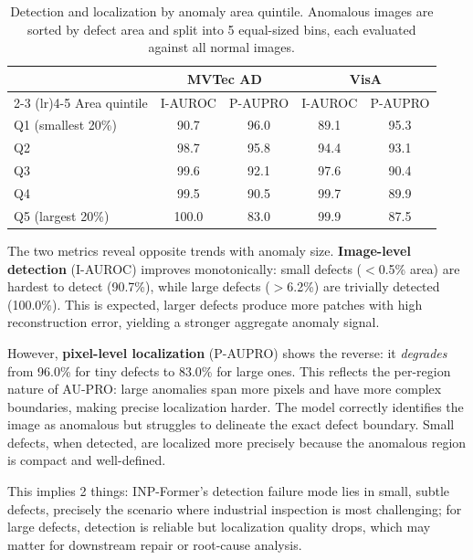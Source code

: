 \documentclass[10pt]{article} %
\begin{document}
\begin{table}[t]
\caption{Detection and localization by anomaly area quintile. Anomalous images are sorted by defect area and split into 5 equal-sized bins, each evaluated against all normal images.}
\label{tab:area}
\begin{center}
\begin{tabular}{lcccc}
\toprule
 & \multicolumn{2}{c}{MVTec AD} & \multicolumn{2}{c}{VisA} \\
\cmidrule(lr){2-3} \cmidrule(lr){4-5}
Area quintile & I-AUROC & P-AUPRO & I-AUROC & P-AUPRO \\
\midrule
Q1 (smallest 20\%) & 90.7 & 96.0 & 89.1 & 95.3 \\
Q2                  & 98.7 & 95.8 & 94.4 & 93.1 \\
Q3                  & 99.6 & 92.1 & 97.6 & 90.4 \\
Q4                  & 99.5 & 90.5 & 99.7 & 89.9 \\
Q5 (largest 20\%)  & 100.0 & 83.0 & 99.9 & 87.5 \\
\bottomrule
\end{tabular}
\end{center}
\end{table}

The two metrics reveal opposite trends with anomaly size. \textbf{Image-level detection} (I-AUROC) improves monotonically: small defects ($<$0.5\% area) are hardest to detect (90.7\%), while large defects ($>$6.2\%) are trivially detected (100.0\%). This is expected, larger defects produce more patches with high reconstruction error, yielding a stronger aggregate anomaly signal.

However, \textbf{pixel-level localization} (P-AUPRO) shows the reverse: it \emph{degrades} from 96.0\% for tiny defects to 83.0\% for large ones. This reflects the per-region nature of AU-PRO: large anomalies span more pixels and have more complex boundaries, making precise localization harder. The model correctly identifies the image as anomalous but struggles to delineate the exact defect boundary. Small defects, when detected, are localized more precisely because the anomalous region is compact and well-defined.

This implies 2 things: INP-Former's detection failure mode lies in small, subtle defects, precisely the scenario where industrial inspection is most challenging; for large defects, detection is reliable but localization quality drops, which may matter for downstream repair or root-cause analysis.
\end{document}
